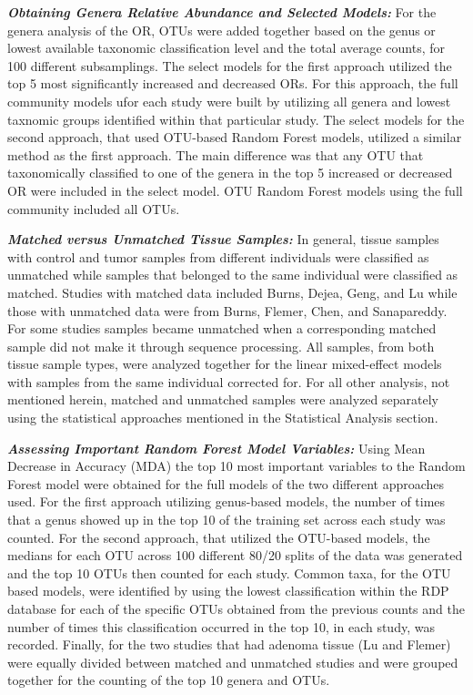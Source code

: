 \documentclass[12pt,]{article}
\begin{document}
\textbf{\emph{Obtaining Genera Relative Abundance and Selected Models:}}
For the genera analysis of the OR, OTUs were added together based on the
genus or lowest available taxonomic classification level and the total
average counts, for 100 different subsamplings. The select models for
the first approach utilized the top 5 most significantly increased and
decreased ORs. For this approach, the full community models ufor each
study were built by utilizing all genera and lowest taxnomic groups
identified within that particular study. The select models for the
second approach, that used OTU-based Random Forest models, utilized a
similar method as the first approach. The main difference was that any
OTU that taxonomically classified to one of the genera in the top 5
increased or decreased OR were included in the select model. OTU Random
Forest models using the full community included all OTUs.

\textbf{\emph{Matched versus Unmatched Tissue Samples:}} In general,
tissue samples with control and tumor samples from different individuals
were classified as unmatched while samples that belonged to the same
individual were classified as matched. Studies with matched data
included Burns, Dejea, Geng, and Lu while those with unmatched data were
from Burns, Flemer, Chen, and Sanapareddy. For some studies samples
became unmatched when a corresponding matched sample did not make it
through sequence processing. All samples, from both tissue sample types,
were analyzed together for the linear mixed-effect models with samples
from the same individual corrected for. For all other analysis, not
mentioned herein, matched and unmatched samples were analyzed separately
using the statistical approaches mentioned in the Statistical Analysis
section.

\textbf{\emph{Assessing Important Random Forest Model Variables:}} Using
Mean Decrease in Accuracy (MDA) the top 10 most important variables to
the Random Forest model were obtained for the full models of the two
different approaches used. For the first approach utilizing genus-based
models, the number of times that a genus showed up in the top 10 of the
training set across each study was counted. For the second approach,
that utilized the OTU-based models, the medians for each OTU across 100
different 80/20 splits of the data was generated and the top 10 OTUs
then counted for each study. Common taxa, for the OTU based models, were
identified by using the lowest classification within the RDP database
for each of the specific OTUs obtained from the previous counts and the
number of times this classification occurred in the top 10, in each
study, was recorded. Finally, for the two studies that had adenoma
tissue (Lu and Flemer) were equally divided between matched and
unmatched studies and were grouped together for the counting of the top
10 genera and OTUs.
\end{document}
